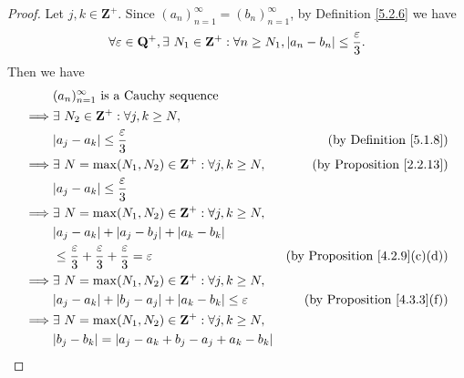 \begin{proof}
    Let \(j, k \in \mathbf{Z}^+\).
    Since \((a_n)_{n = 1}^\infty = (b_n)_{n = 1}^\infty\), by Definition \ref{5.2.6} we have
    \[
        \forall \varepsilon \in \mathbf{Q}^+, \exists\ N_1 \in \mathbf{Z}^+ : \forall n \geq N_1, \abs*{a_n - b_n} \leq \frac{\varepsilon}{3}.
    \]
    Then we have
    \begin{align*}
                 & (a_n)_{n = 1}^\infty \text{ is a Cauchy sequence}                                                                                    \\
        \implies & \exists\ N_2 \in \mathbf{Z}^+ : \forall j, k \geq N,                                                                                 \\
                 & \abs*{a_j - a_k} \leq \frac{\varepsilon}{3}                                              & \text{(by Definition \ref{5.1.8})}        \\
        \implies & \exists\ N = \max(N_1, N_2) \in \mathbf{Z}^+ : \forall j, k \geq N,                      & \text{(by Proposition \ref{2.2.13})}      \\
                 & \abs*{a_j - a_k} \leq \frac{\varepsilon}{3}                                                                                          \\
        \implies & \exists\ N = \max(N_1, N_2) \in \mathbf{Z}^+ : \forall j, k \geq N,                                                                  \\
                 & \abs*{a_j - a_k} + \abs*{a_j - b_j} + \abs*{a_k - b_k}                                                                               \\
                 & \leq \frac{\varepsilon}{3} + \frac{\varepsilon}{3} + \frac{\varepsilon}{3} = \varepsilon & \text{(by Proposition \ref{4.2.9}(c)(d))} \\
        \implies & \exists\ N = \max(N_1, N_2) \in \mathbf{Z}^+ : \forall j, k \geq N,                                                                  \\
                 & \abs*{a_j - a_k} + \abs*{b_j - a_j} + \abs*{a_k - b_k} \leq \varepsilon                  & \text{(by Proposition \ref{4.3.3}(f))}    \\
        \implies & \exists\ N = \max(N_1, N_2) \in \mathbf{Z}^+ : \forall j, k \geq N,                                                                  \\
                 & \abs*{b_j - b_k} = \abs*{a_j - a_k + b_j - a_j + a_k - b_k}                                                                          \\

\end{align*}
\end{proof}
